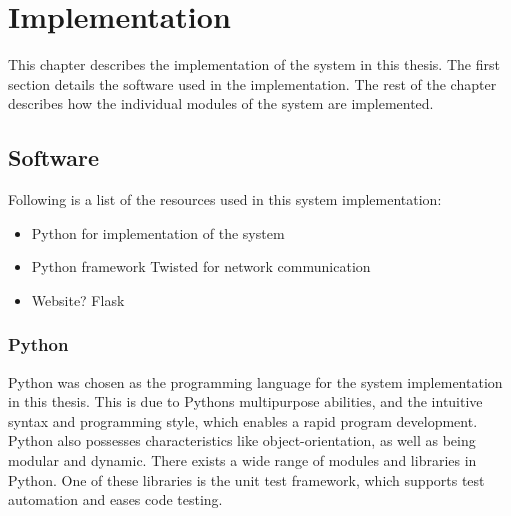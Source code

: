 \chapter{Implementation}
This chapter describes the implementation of the system in this thesis. The first section details the software used in the implementation. The rest of the chapter describes how the individual modules of the system are implemented.
\section{Software}
Following is a list of the resources used in this system implementation:
\begin{itemize}
\item Python for implementation of the system
\item Python framework Twisted for network communication
\item Website? Flask
\end{itemize}

\subsection{Python}
Python \cite{python} was chosen as the programming language for the system implementation in this thesis. This is due to Pythons multipurpose abilities, and the intuitive syntax and programming style, which enables a rapid program development. Python also possesses characteristics like object-orientation, as well as being modular and dynamic. There exists a wide range of modules and libraries in Python. One of these libraries is the unit test framework, which supports test automation and eases code testing.

